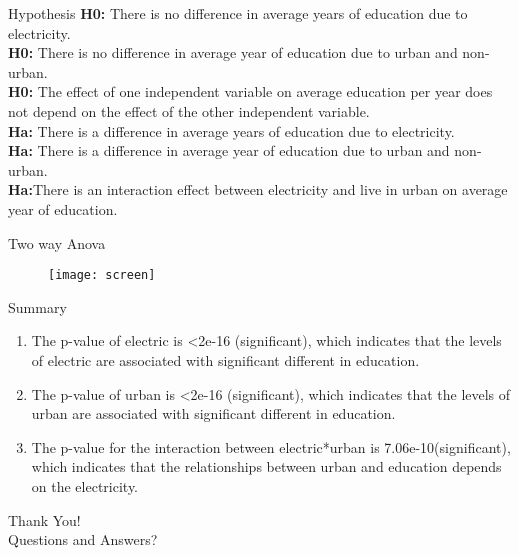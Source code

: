 \documentclass{beamer}
\begin{document}
\begin{frame}[t]{Hypothesis}
	\textbf{H0:} There is no difference in average years of education due to electricity.\\
	\textbf	{H0:} There is no difference in average year of education due to urban and non-urban.\\
	\textbf{H0:} The effect of one independent variable on average education per year does not depend on the effect of the other independent variable.\\
	
	\textbf{	Ha:} There is a difference in average years of education due to electricity.\\
	\textbf{	Ha:} There is a difference in average year of education due to urban and non-urban.\\
	\textbf{	Ha:}There is an interaction effect between electricity and live in urban on average year of education.
\end{frame}
\begin{frame}[t]{Two way Anova}

	\begin{figure}
    \centering
	\texttt{[image: screen]}\\
  
	\end{figure}




\end{frame}
\begin{frame}[t]{Summary}
	\begin{enumerate}
		\item The p-value of electric is <2e-16 (significant), which indicates that the levels of electric are associated with significant different in education.
		\item The p-value of urban is <2e-16 (significant), which indicates that the levels of urban are associated with significant different in education.
		\item The p-value for the interaction between electric*urban is 7.06e-10(significant), which indicates that the relationships between urban and education depends on the electricity.
	\end{enumerate}
\end{frame}
	
	\begingroup
	\begin{frame} [c] { }
		
		\centering
		\large  Thank You! \\
		\centering
		\bigskip
		Questions and Answers?	
	\end{frame}
	\endgroup
	
	
\end{document}

